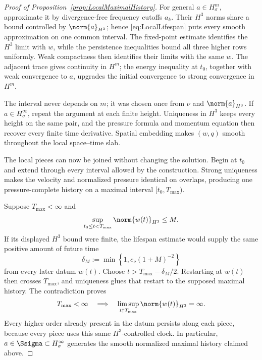 \begin{proof}[Proof of Proposition~\ref{prop:LocalMaximalHistory}]
For general \(a\in H^m_\sigma\), approximate it by divergence-free frequency
cutoffs \(a_k\).  Their \(H^3\) norms share a bound controlled by
\(\norm{a}_{H^3}\); hence \eqref{eq:LocalLifespan} puts every smooth
approximation on one common interval.  The fixed-point estimate identifies the
\(H^3\) limit with \(w\), while the persistence inequalities bound all three
higher rows uniformly.  Weak compactness then identifies their limits with the
same \(w\).  The adjacent trace gives continuity in \(H^m\); the energy
inequality at \(t_0\), together with weak convergence to \(a\), upgrades the
initial convergence to strong convergence in \(H^m\).

The interval never depends on \(m\); it was chosen once from \(\nu\) and
\(\norm{a}_{H^3}\).  If \(a\in H^\infty_\sigma\), repeat the argument at each
finite height.  Uniqueness in \(H^3\) keeps every height on the same pair, and
the pressure formula and momentum equation then recover every finite time
derivative.  Spatial embedding makes \((w,q)\) smooth throughout the local
space--time slab.

The local pieces can now be joined without changing the solution.  Begin at
\(t_0\) and extend through every interval allowed by the construction.
Strong uniqueness makes the velocity and normalized pressure identical on
overlaps, producing one pressure-complete history on a maximal interval
\([t_0,T_{\max})\).

Suppose \(T_{\max}<\infty\) and
\[
  \sup_{t_0\leq t<T_{\max}}\norm{w(t)}_{H^3}\leq M.
\]
If its displayed \(H^3\) bound were finite, the lifespan estimate would supply
the same positive amount of future time
\[
  \delta_M
  :=\min\left\{1,c_\nu(1+M)^{-2}\right\}
\]
from every later datum \(w(t)\).  Choose
\(t>T_{\max}-\delta_M/2\).  Restarting at \(w(t)\) then crosses
\(T_{\max}\), and uniqueness glues that restart to the supposed maximal
history.  The contradiction proves
\begin{equation}
  T_{\max}<\infty
  \quad\Longrightarrow\quad
  \limsup_{t\uparrow T_{\max}}\norm{w(t)}_{H^3}=\infty.
  \label{eq:LocalContinuationAlternative}
\end{equation}
Every higher order already present in the datum persists along each piece,
because every piece uses this same \(H^3\)-controlled clock.  In particular,
\(a\in\Ssigma\subset H^\infty_\sigma\) generates the smooth normalized maximal
history claimed above.
\end{proof}
